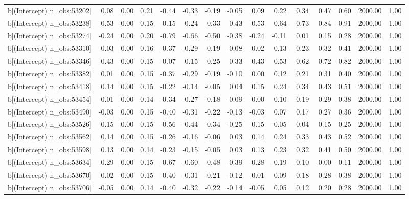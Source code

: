 \begin{table}[ht]
\begin{tabular}{rrrrrrrrrrrrrrr}
  b[(Intercept) n\_obs:53202] & 0.08 & 0.00 & 0.21 & -0.44 & -0.33 & -0.19 & -0.05 & 0.09 & 0.22 & 0.34 & 0.47 & 0.60 & 2000.00 & 1.00 \\ 
  b[(Intercept) n\_obs:53238] & 0.53 & 0.00 & 0.15 & 0.15 & 0.24 & 0.33 & 0.43 & 0.53 & 0.64 & 0.73 & 0.84 & 0.91 & 2000.00 & 1.00 \\ 
  b[(Intercept) n\_obs:53274] & -0.24 & 0.00 & 0.20 & -0.79 & -0.66 & -0.50 & -0.38 & -0.24 & -0.11 & 0.01 & 0.15 & 0.28 & 2000.00 & 1.00 \\ 
  b[(Intercept) n\_obs:53310] & 0.03 & 0.00 & 0.16 & -0.37 & -0.29 & -0.19 & -0.08 & 0.02 & 0.13 & 0.23 & 0.32 & 0.41 & 2000.00 & 1.00 \\ 
  b[(Intercept) n\_obs:53346] & 0.43 & 0.00 & 0.15 & 0.07 & 0.15 & 0.25 & 0.33 & 0.43 & 0.53 & 0.62 & 0.72 & 0.82 & 2000.00 & 1.00 \\ 
  b[(Intercept) n\_obs:53382] & 0.01 & 0.00 & 0.15 & -0.37 & -0.29 & -0.19 & -0.10 & 0.00 & 0.12 & 0.21 & 0.31 & 0.40 & 2000.00 & 1.00 \\ 
  b[(Intercept) n\_obs:53418] & 0.14 & 0.00 & 0.15 & -0.22 & -0.14 & -0.05 & 0.04 & 0.15 & 0.24 & 0.34 & 0.43 & 0.51 & 2000.00 & 1.00 \\ 
  b[(Intercept) n\_obs:53454] & 0.01 & 0.00 & 0.14 & -0.34 & -0.27 & -0.18 & -0.09 & 0.00 & 0.10 & 0.19 & 0.29 & 0.38 & 2000.00 & 1.00 \\ 
  b[(Intercept) n\_obs:53490] & -0.03 & 0.00 & 0.15 & -0.40 & -0.31 & -0.22 & -0.13 & -0.03 & 0.07 & 0.17 & 0.27 & 0.36 & 2000.00 & 1.00 \\ 
  b[(Intercept) n\_obs:53526] & -0.15 & 0.00 & 0.15 & -0.56 & -0.44 & -0.34 & -0.25 & -0.15 & -0.05 & 0.04 & 0.15 & 0.25 & 2000.00 & 1.00 \\ 
  b[(Intercept) n\_obs:53562] & 0.14 & 0.00 & 0.15 & -0.26 & -0.16 & -0.06 & 0.03 & 0.14 & 0.24 & 0.33 & 0.43 & 0.52 & 2000.00 & 1.00 \\ 
  b[(Intercept) n\_obs:53598] & 0.13 & 0.00 & 0.14 & -0.23 & -0.15 & -0.05 & 0.03 & 0.13 & 0.23 & 0.32 & 0.41 & 0.50 & 2000.00 & 1.00 \\ 
  b[(Intercept) n\_obs:53634] & -0.29 & 0.00 & 0.15 & -0.67 & -0.60 & -0.48 & -0.39 & -0.28 & -0.19 & -0.10 & -0.00 & 0.11 & 2000.00 & 1.00 \\ 
  b[(Intercept) n\_obs:53670] & -0.02 & 0.00 & 0.15 & -0.40 & -0.31 & -0.21 & -0.12 & -0.01 & 0.09 & 0.18 & 0.28 & 0.38 & 2000.00 & 1.00 \\ 
  b[(Intercept) n\_obs:53706] & -0.05 & 0.00 & 0.14 & -0.40 & -0.32 & -0.22 & -0.14 & -0.05 & 0.05 & 0.12 & 0.20 & 0.28 & 2000.00 & 1.00 \\ 

\end{tabular}
\end{table}
